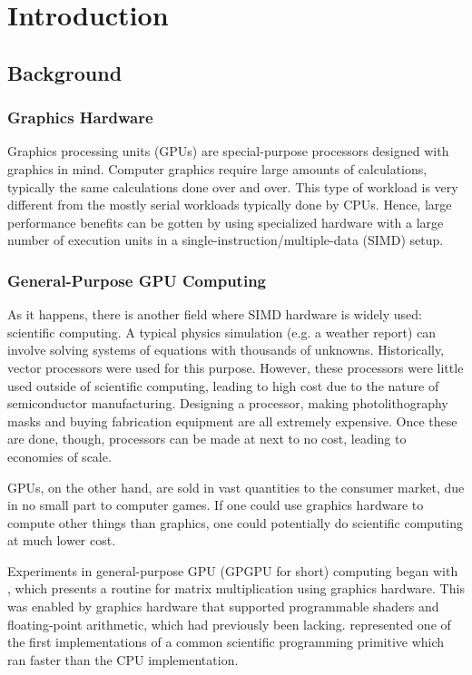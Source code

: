 \chapter{Introduction}

\section{Background}
\subsection{Graphics Hardware}
Graphics processing units (GPUs) are special-purpose processors designed with graphics in mind. Computer graphics require large amounts of calculations, typically the same calculations done over and over. This type of workload is very different from the mostly serial workloads typically done by CPUs. Hence, large performance benefits can be gotten by using specialized hardware with a large number of execution units in a single-instruction/multiple-data (SIMD) setup.

\subsection{General-Purpose GPU Computing}
As it happens, there is another field where SIMD hardware is widely used: scientific computing. A typical physics simulation (e.g. a weather report) can involve solving systems of equations with thousands of unknowns. Historically, vector processors were used for this purpose. However, these processors were little used outside of scientific computing, leading to high cost due to the nature of semiconductor manufacturing. Designing a processor, making photolithography masks and buying fabrication equipment are all extremely expensive. Once these are done, though, processors can be made at next to no cost, leading to economies of scale. 

GPUs, on the other hand, are sold in vast quantities to the consumer market, due in no small part to computer games. If one could use graphics hardware to compute other things than graphics, one could potentially do scientific computing at much lower cost.

Experiments in general-purpose GPU (GPGPU for short) computing began with \citet{larsen2001fast}, which presents a routine for matrix multiplication using graphics hardware. This was enabled by graphics hardware that supported programmable shaders and floating-point arithmetic, which had previously been lacking. \citet{galoppo2005lu} represented one of the first implementations of a common scientific programming primitive which ran faster than the CPU implementation.

